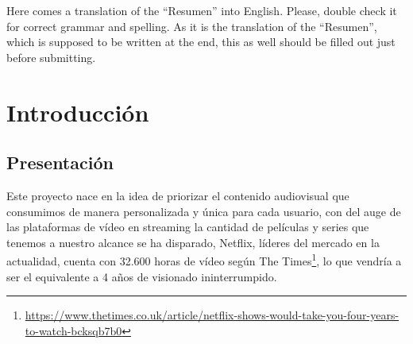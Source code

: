 \documentclass[a4paper, 12pt]{book}
\begin{document}
Here comes a translation of the ``Resumen'' into English. 
Please, double check it for correct grammar and spelling.
As it is the translation of the ``Resumen'', which is supposed to be written at the end, this as well should be filled out just before submitting.




\tableofcontents 
\cleardoublepage
\listoffigures %



\cleardoublepage
\chapter{Introducción}
\label{chap:introduccion} %

\section{Presentación}
\label{sec:presentacion}

Este proyecto nace en la idea de priorizar el contenido audiovisual que consumimos de manera personalizada y única para cada usuario, con del auge de las plataformas de vídeo en streaming la cantidad de películas y series que tenemos a nuestro alcance se ha disparado, Netflix, líderes del mercado en la actualidad, cuenta con 32.600 horas de vídeo según The Times\footnote{\url{https://www.thetimes.co.uk/article/netflix-shows-would-take-you-four-years-to-watch-bcksqb7b0}}, lo que vendría a ser el equivalente a 4 años de visionado ininterrumpido.
\end{document}
